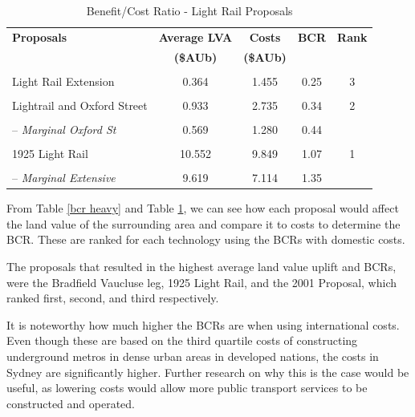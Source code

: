 \documentclass[preprint,12pt,authoryear]{elsarticle}
\begin{document}
\begin{table}[H]
\centering
 
\caption{Benefit/Cost Ratio - Light Rail Proposals}\label{light rail bcr}

\begin{tabular}{p{4cm}cccc}
    \midrule

    \textbf{Proposals}& \textbf{Average LVA}& \textbf{Costs}& \textbf{BCR }& \textbf{Rank}\\
 & \textbf{ (\$AUb)}& \textbf{ (\$AUb)}& &\\
    \midrule
 & & & & \\
 Light Rail Extension& 0.364& 1.455& 0.25
&3\\
 
& & & &
\\
 Lightrail and Oxford Street & 0.933& 2.735& 0.34
& 2\\
 
& & & &
\\
-- \textit{Marginal Oxford St}& 0.569& 1.280& 0.44
& \\
 
& & & &
\\
 1925 Light Rail& 10.552& 9.849& 1.07
& 1\\
 
& & & &
\\
-- \textit{Marginal Extensive}& 9.619& 7.114& 1.35
&\\
\bottomrule
\end{tabular}
\end{table}


From Table \ref{bcr heavy} and Table \ref{light rail bcr}, we can see how each proposal would affect the land value of the surrounding area and compare it to costs to determine the BCR. These are ranked for each technology using the BCRs with domestic costs.

The proposals that resulted in the highest average land value uplift and BCRs, were the Bradfield Vaucluse leg, 1925 Light Rail, and the 2001 Proposal, which ranked first, second, and third respectively. 


It is noteworthy how much higher the BCRs are when using international costs. Even though these are based on the third quartile costs of constructing underground metros in dense urban areas in developed nations, the costs in Sydney are significantly higher. Further research on why this is the case would be useful, as lowering costs would allow more  public transport services to be constructed and operated. 
\end{document}
